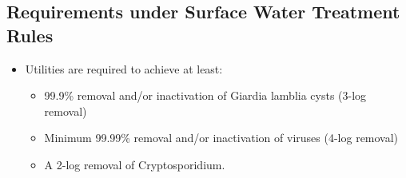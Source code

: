 \subsection{Requirements under Surface Water Treatment Rules} 
\begin{itemize}
\item Utilities are required to achieve at least:
\begin{itemize}
\item 99.9\% removal and/or inactivation of Giardia lamblia cysts (3-log removal)
\item Minimum 99.99\% removal and/or inactivation of viruses (4-log removal)
\item A 2-log removal of Cryptosporidium. 
\end{itemize}


\end{itemize}
